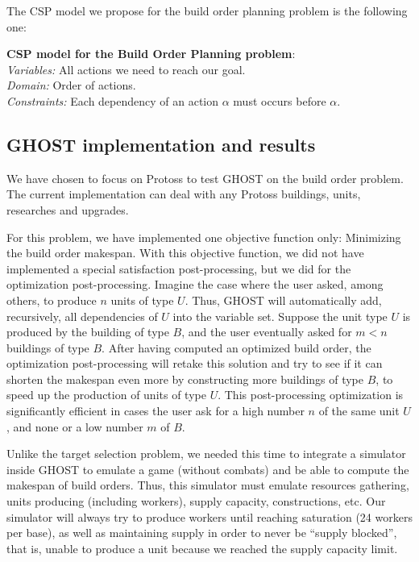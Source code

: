 \documentclass{article}
\newcommand{\csp}{\textsc{CSP}\xspace}
\newcommand{\ghost}{\textsc{GHOST}\xspace}
\newcommand{\modelcsp}[4]%
{ \begin{trivlist}
  \item[]%
    \textbf{CSP model for #1}:\\
    \textit{Variables:} #2\\
    \textit{Domain:} #3\\
    \textit{Constraints:} #4
  \end{trivlist}%
}
\begin{document}
The \csp model we propose for  the build order planning problem is the
following one:
\modelcsp{the Build Order Planning problem}%
{All actions we need to reach our goal.}%
{Order of actions.}%
{Each dependency of an action $\alpha$ must occurs before $\alpha$.}

\subsection{\ghost implementation and results}

We have chosen to  focus on Protoss to test \ghost  on the build order
problem.   The  current  implementation  can  deal  with  any  Protoss
buildings, units, researches and upgrades.

For this  problem, we  have implemented  one objective  function only:
Minimizing the build order makespan.  With this objective function, we
did not  have implemented a special  satisfaction post-processing, but
we did  for the optimization  post-processing. Imagine the  case where
the user asked, among others, to  produce $n$ units of type $U$. Thus,
\ghost will  automatically add,  recursively, all dependencies  of $U$
into the variable  set.  Suppose the unit type $U$  is produced by the
building  of type  $B$, and  the  user eventually  asked for  $m <  n$
buildings  of type  $B$.   After having  computed  an optimized  build
order, the optimization post-processing  will retake this solution and
try to  see if it can  shorten the makespan even  more by constructing
more buildings  of type $B$,  to speed up  the production of  units of
type   $U$.   This   post-processing  optimization   is  significantly
efficient in cases the user ask for a high number $n$ of the same unit
$U$, and none or a low number $m$ of $B$.

Unlike the target selection problem,  we needed this time to integrate
a simulator inside  \ghost to emulate a game (without  combats) and be
able to  compute the  makespan of build  orders. Thus,  this simulator
must emulate resources gathering, units producing (including workers),
supply capacity, constructions, etc.  Our simulator will always try to
produce workers  until reaching saturation  (24 workers per  base), as
well as  maintaining supply in  order to never be  ``supply blocked'',
that  is, unable  to  produce a  unit because  we  reached the  supply
capacity limit.
\end{document}
